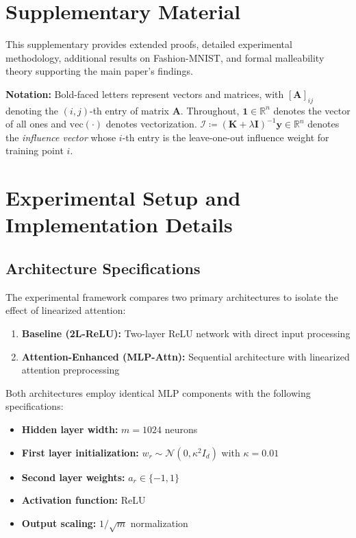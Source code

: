 \documentclass{article}
\theoremstyle{plain}
\theoremstyle{definition}
\theoremstyle{remark}
\newcommand{\R}{\mathbb{R}}
\begin{document}
\clearpage



\newpage
\appendix

\section*{Supplementary Material}

This supplementary provides extended proofs, detailed experimental methodology, additional results on Fashion-MNIST, and formal malleability theory supporting the main paper's findings.

\textbf{Notation:} Bold-faced letters represent vectors and matrices, with $[\mathbf{A}]_{ij}$ denoting the $(i,j)$-th entry of matrix $\mathbf{A}$. Throughout, $\mathbf{1} \in \R^n$ denotes the vector of all ones and $\text{vec}(\cdot)$ denotes vectorization. $\boldsymbol{\mathcal{I}} \coloneq (\mathbf{K}+\lambda\mathbf{I})^{-1}\mathbf{y} \in \R^n$ denotes the \emph{influence vector} whose $i$-th entry is the leave-one-out influence weight for training point $i$.

\section{Experimental Setup and Implementation Details}
\label{app:experimental}

\subsection{Architecture Specifications}

The experimental framework compares two primary architectures to isolate the effect of linearized attention:

\begin{enumerate}
\item \textbf{Baseline (2L-ReLU):} Two-layer ReLU network with direct input processing
\item \textbf{Attention-Enhanced (MLP-Attn):} Sequential architecture with linearized attention preprocessing
\end{enumerate}

Both architectures employ identical MLP components with the following specifications:
\begin{itemize}
\item \textbf{Hidden layer width:} $m = 1024$ neurons
\item \textbf{First layer initialization:} $w_r \sim \mathcal{N}(0, \kappa^2 I_d)$ with $\kappa = 0.01$
\item \textbf{Second layer weights:} $a_r \in \{-1, 1\}$
\item \textbf{Activation function:} ReLU
\item \textbf{Output scaling:} $1/\sqrt{m}$ normalization
\end{itemize}
\end{document}
